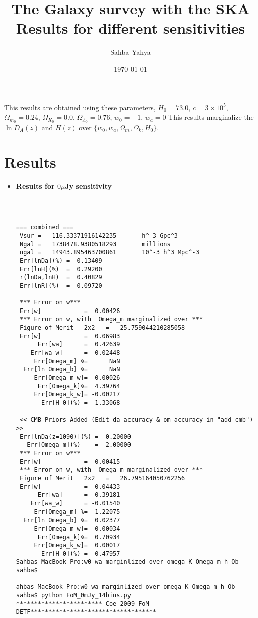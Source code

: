 \documentclass[11pt]{amsart}
\title{The Galaxy survey with the SKA  Results for different sensitivities}
\author{Sahba Yahya}
\date \today                                         %
\begin{document}
\maketitle


This results are obtained using these parameters,   $H_0 = 73.0$, 
 $ c = 3 \times 10^{5}$,
 $ \Omega_{m_0} = 0.24$,
  $\Omega_{K_0}= 0.0$,
  $\Omega_{\Lambda_0}= 0.76$,
  $w_0=-1$,
 $ w_a = 0$
 This results marginalize the $\ln D_A(z)$ and $H(z)$ over $\{w_0, w_a, \Omega_m, \Omega_k, H_0\}$.
\section{ \textbf{Results}}
\begin{itemize}
\item \textbf{Results for $0 \mu$Jy sensitivity}


\begin{verbatim}



=== combined ===
 Vsur =   116.33371916142235       h^-3 Gpc^3
 Ngal =   1738478.9380518293       millions
 ngal =   14943.895463700861       10^-3 h^3 Mpc^-3
 Err[lnDa](%) =  0.13409
 Err[lnH](%)  =  0.29200
 r(lnDa,lnH)  =  0.40829
 Err[lnR](%)  =  0.09720

 *** Error on w***
 Err[w]            =  0.00426
 *** Error on w, with  Omega_m marginalized over ***
 Figure of Merit   2x2   =   25.759044210285058
 Err[w]            =  0.06983
      Err[wa]      =  0.42639
    Err[wa_w]      = -0.02448
     Err[Omega_m] %=      NaN
  Err[ln Omega_b] %=      NaN
     Err[Omega_m_w]= -0.00026
      Err[Omega_k]%=  4.39764
     Err[Omega_k_w]= -0.00217
       Err[H_0](%) =  1.33068

 << CMB Priors Added (Edit da_accuracy & om_accuracy in "add_cmb") >>
 Err[lnDa(z=1090)](%) =  0.20000
   Err[Omega_m](%)    =  2.00000
 *** Error on w***
 Err[w]            =  0.00415
 *** Error on w, with  Omega_m marginalized over ***
 Figure of Merit   2x2   =   26.795164050762256
 Err[w]            =  0.04433
      Err[wa]      =  0.39181
    Err[wa_w]      = -0.01540
     Err[Omega_m] %=  1.22075
  Err[ln Omega_b] %=  0.02377
     Err[Omega_m_w]=  0.00034
      Err[Omega_k]%=  0.70934
     Err[Omega_k_w]=  0.00017
       Err[H_0](%) =  0.47957
Sahbas-MacBook-Pro:w0_wa_marginlized_over_omega_K_Omega_m_h_Ob sahba$

ahbas-MacBook-Pro:w0_wa_marginlized_over_omega_K_Omega_m_h_Ob sahba$ python FoM_0mJy_14bins.py
************************ Coe 2009 FoM DETF***********************************


\end{verbatim}
\end{itemize}
\end{document}
